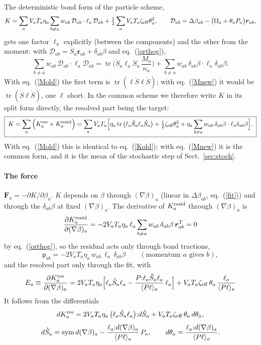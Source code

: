 \documentclass[11pt,aps,preprint,nofootinbib,superscriptaddress,tightenlines]{revtex4-2}
\newcommand{\pf}{\bm{\mathsf p}}
\def\st{\begin{equation}}
\def\stp{\end{equation}}
\def\Eq#1{eq.~(\ref{#1})}
\def\Sect#1{Sect.~\ref{#1}}
\def\tr{\operatorname{tr}}
\let\oldparagraph\paragraph
\renewcommand{\paragraph}{\par\bigskip\oldparagraph}
\begin{document}
The deterministic bond form of the particle scheme,
\st
K=\sum_aV_aT_a\eta_a\sum_{b\neq a}w_{ab}\,\mathcal D_{ab}\cdot\ell_a\,\mathcal D_{ab}+\tfrac12\sum_aV_aT_a\zeta_{\rm eff}\theta_a^2,\qquad
\mathcal D_{ab}=\Delta\beta_{ab}-\big(\Omega_a+\theta_aP_a\big)\bm r_{ab} ,
\label{Kold}
\stp
gets one factor $\ell_a$ explicitly (between the components) and the other from the moment: with
$\mathcal D_{ab}=\mathring S_a\bm r_{ab}+\delta_{ab}\beta$ and \Eq{orthog},
\st
\sum_{b\neq a}w_{ab}\,\mathcal D_{ab}\cdot\ell_a\mathcal D_{ab}=\tr\Big(\mathring S_a\ell_a\mathring S_a\,\frac{M_a}{n_a}\Big)+\sum_{b\neq a}w_{ab}\,\delta_{ab}\beta\cdot\ell_a\delta_{ab}\beta .
\label{split}
\stp
With \Eq{Mold} the first term is $\tr(\ell\mathring S\ell\mathring S)$; with \Eq{Mnew} it would be $\tr(\mathring S\ell\mathring S)$, one $\ell$ short.  In the common scheme
we therefore write $K$ in its split form directly, the resolved part being the target:
\st
\boxed{\;K=\sum_a\Big(K_a^{\rm res}+K_a^{\rm resid}\Big)
=\sum_aV_aT_a\Big[\eta_a\tr\big(\ell_a\mathring S_a\ell_a\mathring S_a\big)+\tfrac12\zeta_{\rm eff}\theta_a^2+\eta_a\sum_{b\neq a}w_{ab}\,\delta_{ab}\beta\cdot\ell_a\delta_{ab}\beta\Big].\;}
\label{Knew}
\stp
With \Eq{Mold} this is identical to \Eq{Kold}; with \Eq{Mnew} it is the common form, and it is the mean of
the stochastic step of \Sect{sec:stoch}.

\paragraph{The force} $\bm F_a=-\partial K/\partial\beta_a$.  $K$ depends on $\beta$ through $(\nabla\beta)_a$ (linear in $\Delta\beta_{ab}$, \Eq{fit}) and through the
$\delta_{ab}\beta$ at fixed $(\nabla\beta)_a$.  The derivative of $K_a^{\rm resid}$ through $(\nabla\beta)_a$ is
\st
\frac{\partial K_a^{\rm resid}}{\partial (\nabla\beta)_a}=-2V_aT_a\eta_a\,\ell_a\sum_{b\neq a}w_{ab}\,\delta_{ab}\beta\,\bm r_{ab}^T=0
\stp
by \Eq{orthog}, so the residual acts only through bond tractions,
\st
\pf_{ab}=-2V_aT_a\eta_a\,w_{ab}\,\ell_a\,\delta_{ab}\beta\qquad(\text{momentum }a\text{ gives }b),
\label{tresid}
\stp
and the resolved part only through the fit, with
\st
E_a\equiv\frac{\partial K_a^{\rm res}}{\partial (\nabla\beta)_a}
=2V_aT_a\eta_a\Big[\ell_a\mathring S_a\ell_a-\frac{P{:}\ell_a\mathring S_a\ell_a}{\langle P\ell\rangle_a}\,\ell_a\Big]
+V_aT_a\zeta_{\rm eff}\,\theta_a\,\frac{\ell_a}{\langle P\ell\rangle_a}
\label{E}
\stp
It follows from the differentials
\st
dK_a^{\rm res}=2V_aT_a\eta_a\,\big(\ell_a\mathring S_a\ell_a\big){:}d\mathring S_a+V_aT_a\zeta_{\rm eff}\,\theta_a\,d\theta_a ,
\stp
\st
d\mathring S_a={\rm sym}\,d(\nabla\beta)_a-\frac{\ell_a{:}d(\nabla\beta)_a}{\langle P\ell\rangle_a}\,P_a ,\qquad
d\theta_a=\frac{\ell_a{:}d(\nabla\beta)_a}{\langle P\ell\rangle_a} .
\stp
\end{document}
